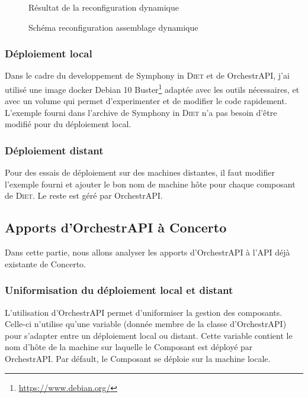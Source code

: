 \documentclass{article}
\newcommand{\api}{API\xspace}
\newcommand{\diet}{\textsc{Diet}\xspace} %
\newcommand{\concerto}{Concerto\xspace}
\newcommand{\symphonyind}{Symphony in \diet} %
\newcommand{\orchestrapi}{OrchestrAPI\xspace}
\begin{document}
\begin{figure}[h!]
\centering
	
\caption{Résultat de la reconfiguration dynamique}
\label{fig:reconf_diet}
\end{figure}

\begin{figure}[h!]
\centering
	
\caption{Schéma reconfiguration assemblage dynamique}
\label{fig:reconf_assembly}
\end{figure}


\subsubsection{Déploiement local}
Dans le cadre du developpement de \symphonyind et de \orchestrapi, j'ai utilisé
une image docker Debian 10 Buster\footnote{\url{https://www.debian.org/}}
adaptée avec les outils nécessaires, et avec un volume qui permet d'experimenter
et de modifier le code rapidement. L'exemple fourni dans l'archive de
\symphonyind n'a pas besoin d'être modifié pour du déploiement local.

\subsubsection{Déploiement distant}
Pour des essais de déploiement sur des machines distantes, il faut modifier
l'exemple fourni et ajouter le bon nom de machine hôte pour chaque composant de
\diet. Le reste est géré par \orchestrapi.

\subsection{Apports d'\orchestrapi à \concerto}\label{apport_orchestrapi}
Dans cette partie, nous allons analyser les apports d'\orchestrapi à l'\api déjà
existante de \concerto.

\subsubsection{Uniformisation du déploiement local et distant}
L'utilisation d'\orchestrapi permet d'uniformiser la gestion des composants.
Celle-ci n'utilise qu'une variable (donnée membre de la classe d'\orchestrapi)
pour s'adapter entre un déploiement local ou distant. Cette variable contient le
nom d'hôte de la machine sur laquelle le Composant est déployé par \orchestrapi.
Par défault, le Composant se déploie sur la machine locale.
\end{document}
